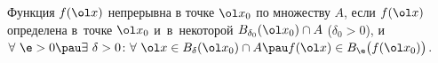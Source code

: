 
	 Функция $f(\ol x)$ непрерывна в точке $\ol x_0$ по множеству $A$, если $f(\ol x)$ определена в~точке $\ol x_0$ и~в~некоторой
	 $B_{\delta_0}(\ol x_0)\cap A$ ($\delta_0>0$), и $\forall\ \e>0\pau \exists\ \delta>0\colon
	 \forall\ \ol x\in B_\delta(\ol x_0)\cap A\pau f(\ol x)\in B_\e\big(f(\ol x_0)\big)$.
	 